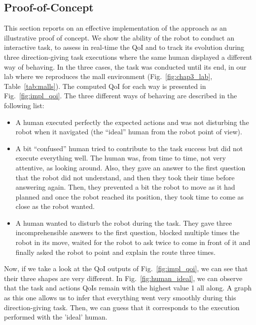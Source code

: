 \documentclass[a4paper,11pt,twoside]{StyleThese}
\begin{document}
\subsection{Proof-of-Concept}\label{subsec:results}
This section reports on an effective implementation of the approach as an illustrative proof of concept. We show the ability of the robot to conduct an interactive task, to assess in real-time the QoI and to track its evolution during three direction-giving task executions where the same human displayed a different way of behaving. In the three cases, the task was conducted until its end, in our lab where we reproduces the mall environment (Fig.~\ref{fig:chap3_lab}, Table~\ref{tab:malls}). The computed QoI for each way is presented in Fig.~\ref{fig:impl_qoi}. The three different ways of behaving are described in the following list:
\begin{itemize}
	\item A human executed perfectly the expected actions and was not disturbing the robot when it navigated (\ie the ``ideal'' human from the robot point of view). 
	\item A bit ``confused'' human tried to contribute to the task success but did not execute everything well. The human was, from time to time, not very attentive, as looking around. Also, they gave an answer to the first question that the robot did not understand, and then they took their time before answering again. Then, they prevented a bit the robot to move as it had planned and once the robot reached its position, they took time to come as close as the robot wanted. 
	\item A human wanted to disturb the robot during the task. They gave three incomprehensible answers to the first question, blocked multiple times the robot in its move, waited for the robot to ask twice to come in front of it and finally asked the robot to point and explain the route three times. 
\end{itemize}

Now, if we take a look at the QoI outputs of Fig.~\ref{fig:impl_qoi}, we can see that their three shapes are very different. In Fig.~\ref{fig:human_ideal}, we can observe that the task and actions QoIs remain with the highest value 1 all along. A graph as this one allows us to infer that everything went very smoothly during this direction-giving task. Then, we can guess that it corresponds to the execution performed with the 'ideal' human. 
\end{document}
